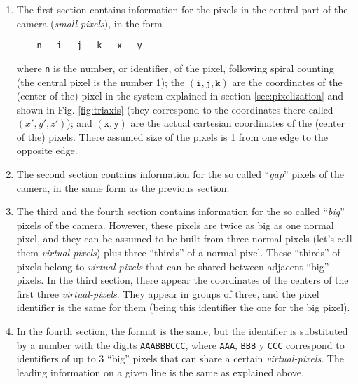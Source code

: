 \begin{enumerate}
  
\item The first section contains information for the pixels in the
  central part of the camera (\emph{small pixels}), in the form
%
\begin{verbatim}
    n   i   j   k   x   y
\end{verbatim}
%
  where \texttt{n} is the number, or identifier, of the pixel,
  following spiral counting (the central pixel is the number 1); the
  $(\texttt{i},\texttt{j},\texttt{k})$ are the coordinates of the
  (center of the) pixel in the system explained in section
  \ref{sec:pixelization} and shown in Fig. \ref{fig:triaxis} (they
  correspond to the coordinates there called $(x',y',z')$); and
  $(\texttt{x},\texttt{y})$ are the actual cartesian coordinates of
  the (center of the) pixels.  There assumed size of the pixels is 1
  from one edge to the opposite edge.
  
\item The second section contains information for the so called
  ``\emph{gap}'' pixels of the camera, in the same form as the
  previous section.
  
\item The third and the fourth section contains information for the so
  called ``\emph{big}'' pixels of the camera. However, these pixels
  are twice as big as one normal pixel, and they can be assumed to be
  built from three normal pixels (let's call them
  \emph{virtual-pixels}) plus three ``thirds'' of a normal pixel. These
  ``thirds'' of pixels belong to \emph{virtual-pixels} that can be
  shared between adjacent ``big'' pixels.  In the third section, there
  appear the coordinates of the centers of the first three
  \emph{virtual-pixels}.  They appear in groups of three, and the pixel
  identifier is the same for them (being this identifier the one for
  the big pixel).
  
\item In the fourth section, the format is the same, but the
  identifier is substituted by a number with the digits
  \texttt{AAABBBCCC}, where \texttt{AAA}, \texttt{BBB} y \texttt{CCC}
  correspond to identifiers of up to 3 ``big'' pixels that can share a
  certain \emph{virtual-pixels}. The leading information on a given
  line is the same as explained above.

\end{enumerate}

